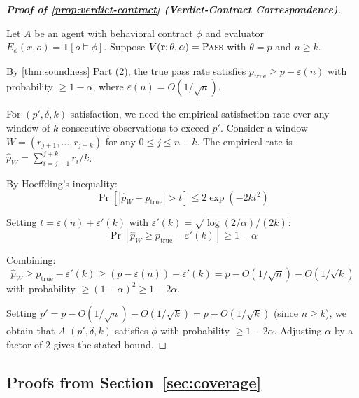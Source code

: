 \begin{proof}[\textbf{Proof of \cref{prop:verdict-contract} (Verdict-Contract Correspondence)}]
\label{app:proof:contract}

Let $A$ be an agent with behavioral contract $\phi$ and evaluator
$E_\phi(x, o) = \mathbf{1}[o \models \phi]$. Suppose
$V(\mathbf{r}; \theta, \alpha) = \textsc{Pass}$ with $\theta = p$ and $n \geq k$.

By \cref{thm:soundness} Part (2), the true pass rate satisfies
$p_{\text{true}} \geq p - \varepsilon(n)$ with probability $\geq 1-\alpha$,
where $\varepsilon(n) = O(1/\sqrt{n})$.

For $(p', \delta, k)$-satisfaction, we need the empirical satisfaction
rate over any window of $k$ consecutive observations to exceed $p'$.
Consider a window $W = (r_{j+1}, \ldots, r_{j+k})$ for any
$0 \leq j \leq n - k$. The empirical rate is
$\hat{p}_W = \sum_{i=j+1}^{j+k} r_i / k$.

By Hoeffding's inequality:
\begin{equation}
  \Pr\!\left[|\hat{p}_W - p_{\text{true}}| > t\right]
  \leq 2\exp(-2kt^2)
\end{equation}

Setting $t = \varepsilon(n) + \varepsilon'(k)$ with
$\varepsilon'(k) = \sqrt{\log(2/\alpha) / (2k)}$:
\begin{equation}
  \Pr[\hat{p}_W \geq p_{\text{true}} - \varepsilon'(k)]
  \geq 1 - \alpha
\end{equation}

Combining:
\begin{equation}
  \hat{p}_W \geq p_{\text{true}} - \varepsilon'(k)
  \geq (p - \varepsilon(n)) - \varepsilon'(k)
  = p - O(1/\sqrt{n}) - O(1/\sqrt{k})
\end{equation}
with probability $\geq (1-\alpha)^2 \geq 1-2\alpha$.

Setting $p' = p - O(1/\sqrt{n}) - O(1/\sqrt{k}) = p - O(1/\sqrt{k})$
(since $n \geq k$), we obtain that $A$ $(p', \delta, k)$-satisfies $\phi$
with probability $\geq 1 - 2\alpha$. Adjusting $\alpha$ by a factor of 2
gives the stated bound. \qedhere
\end{proof}


\subsection{Proofs from Section~\ref{sec:coverage}}
\label{app:proofs:coverage}

